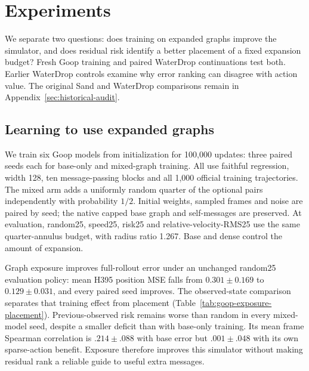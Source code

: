 \section{Experiments}
We separate two questions: does training on expanded graphs improve the simulator, and does residual risk identify a better placement of a fixed expansion budget? Fresh Goop training and paired WaterDrop continuations test both. Earlier WaterDrop controls examine why error ranking can disagree with action value. The original Sand and WaterDrop comparisons remain in Appendix~\ref{sec:historical-audit}.

\subsection{Learning to use expanded graphs}
We train six Goop models from initialization for 100,000 updates: three paired seeds each for base-only and mixed-graph training. All use faithful regression, width 128, ten message-passing blocks and all 1,000 official training trajectories. The mixed arm adds a uniformly random quarter of the optional pairs independently with probability $1/2$. Initial weights, sampled frames and noise are paired by seed; the native capped base graph and self-messages are preserved. At evaluation, random25, speed25, risk25 and relative-velocity-RMS25 use the same quarter-annulus budget, with radius ratio 1.267. Base and dense control the amount of expansion.

Graph exposure improves full-rollout error under an unchanged random25 evaluation policy: mean H395 position MSE falls from $0.301\pm0.169$ to $0.129\pm0.031$, and every paired seed improves. The observed-state comparison separates that training effect from placement (Table~\ref{tab:goop-exposure-placement}). Previous-observed risk remains worse than random in every mixed-model seed, despite a smaller deficit than with base-only training. Its mean frame Spearman correlation is $.214\pm.088$ with base error but $.001\pm.048$ with its own sparse-action benefit. Exposure therefore improves this simulator without making residual rank a reliable guide to useful extra messages.

